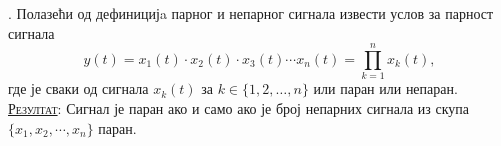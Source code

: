 \noindent
\textbf{\ID}. 
Полазећи од дефиницијa парног и непарног сигнала
извести услов за парност сигнала
$$
	y(t) = x_1(t) \cdot x_2(t) \cdot x_3(t) \cdots x_n(t) = 
	\prod_{k = 1}^n x_k(t),
$$
где је сваки од сигнала $x_k(t)$ за $k \in \{1,2,\ldots,n\}$
или паран или непаран.
\\[2mm]

\textsc{\underline{Резултат}}: 
Сигнал је паран ако и само ако је број непарних сигнала из скупа $\{
x_1, x_2, \cdots, x_n\}$ паран. \\[5mm]

